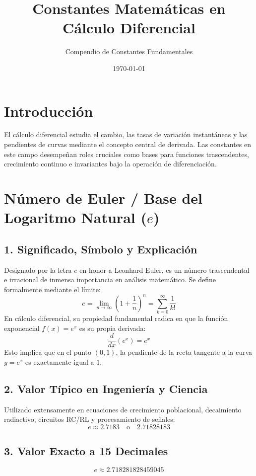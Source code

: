 \documentclass[12pt,a4paper]{article}
\title{\textbf{Constantes Matemáticas en Cálculo Diferencial}}
\author{Compendio de Constantes Fundamentales}
\date{\today}
\begin{document}
\maketitle

\section*{Introducción}
El cálculo diferencial estudia el cambio, las tasas de variación instantáneas y las pendientes de curvas mediante el concepto central de derivada. Las constantes en este campo desempeñan roles cruciales como bases para funciones trascendentes, crecimiento continuo e invariantes bajo la operación de diferenciación.

\section{Número de Euler / Base del Logaritmo Natural ($e$)}

\subsection*{1. Significado, Símbolo y Explicación}
Designado por la letra $e$ en honor a Leonhard Euler, es un número trascendental e irracional de inmensa importancia en análisis matemático. Se define formalmente mediante el límite:
\begin{equation*}
e = \lim_{n \to \infty} \left(1 + \frac{1}{n}\right)^n = \sum_{k=0}^{\infty} \frac{1}{k!}
\end{equation*}
En cálculo diferencial, su propiedad fundamental radica en que la función exponencial $f(x) = e^x$ es su propia derivada:
\begin{equation*}
\frac{d}{dx}\left(e^x\right) = e^x
\end{equation*}
Esto implica que en el punto $(0,1)$, la pendiente de la recta tangente a la curva $y = e^x$ es exactamente igual a $1$.

\subsection*{2. Valor Típico en Ingeniería y Ciencia}
Utilizado extensamente en ecuaciones de crecimiento poblacional, decaimiento radiactivo, circuitos RC/RL y procesamiento de señales:
\begin{equation*}
e \approx 2.7183 \quad \text{o} \quad 2.71828183
\end{equation*}

\subsection*{3. Valor Exacto a 15 Decimales}
\begin{equation*}
e \approx 2.718281828459045
\end{equation*}
\end{document}
